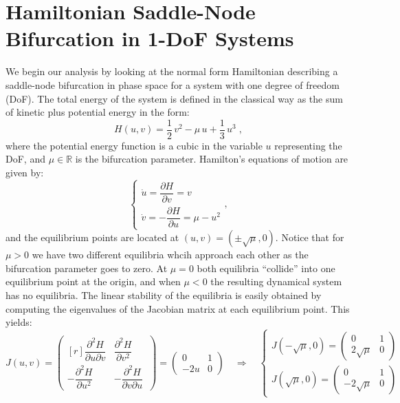 \documentclass[8pt]{article}
\begin{document}
\section{Hamiltonian Saddle-Node Bifurcation in 1-DoF Systems}

We begin our analysis by looking at the normal form Hamiltonian describing a saddle-node bifurcation in phase space for a system with one degree of freedom (DoF). The total energy of the system is defined in the classical way as the sum of kinetic plus potential energy in the form:
\begin{equation}
H(u,v) = \frac{1}{2} \, v^2  - \mu \, u + \frac{1}{3} \,u^3 \;,
\label{eq:ham_1dof}
\end{equation}
where the potential energy function is a cubic in the variable $u$ representing the DoF, and $\mu \in \mathbb{R}$ is the bifurcation parameter. Hamilton's equations of motion are given by:
\begin{equation}
\begin{cases}
\dot{u} = \dfrac{\partial H}{\partial v} = v \\[.3cm]
\dot{v} = -\dfrac{\partial H}{\partial u} = \mu - u^2
\end{cases},
\label{eq:hameq1}
\end{equation}
and the equilibrium points are located at $(u,v) = (\pm\sqrt{\mu},0)$. Notice that for $\mu > 0$ we have two different equilibria whcih approach each other as the bifurcation parameter goes to zero. At $\mu = 0$ both equilibria ``collide'' into one equilibrium point at the origin, and when $\mu < 0$ the resulting dynamical system has no equilibria. The linear stability of the equilibria is easily obtained by computing the eigenvalues of the Jacobian matrix at each equilibrium point. This yields:
\begin{equation}
J(u,v) = 
\begin{pmatrix*}[r]
\dfrac{\partial^2 H}{\partial u \partial v} & \dfrac{\partial^2 H}{\partial v^2} \, \\[.4cm]
-\dfrac{\partial^2 H}{\partial u^2} & -\dfrac{\partial^2 H}{\partial v \partial u} \,
\end{pmatrix*} = 
\begin{pmatrix}
0 & 1 \\
-2 u & 0
\end{pmatrix} \quad \Rightarrow \quad 
\begin{cases}
J(-\sqrt{\mu},0) = 
\begin{pmatrix}
0 & 1 \\
2 \sqrt{\mu} & 0
\end{pmatrix} \\[.5cm]
J(\sqrt{\mu},0) = 
\begin{pmatrix}
0 & 1 \\
-2 \sqrt{\mu} & 0
\end{pmatrix}
\end{cases}
\end{equation}
\end{document}
